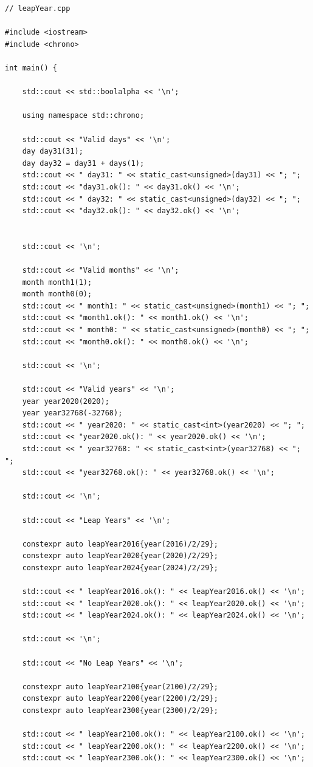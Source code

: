 \begin{lstlisting}[style=styleCXX]
// leapYear.cpp

#include <iostream>
#include <chrono>

int main() {
	
	std::cout << std::boolalpha << '\n';
	
	using namespace std::chrono;
	
	std::cout << "Valid days" << '\n';
	day day31(31);
	day day32 = day31 + days(1);
	std::cout << " day31: " << static_cast<unsigned>(day31) << "; ";
	std::cout << "day31.ok(): " << day31.ok() << '\n';
	std::cout << " day32: " << static_cast<unsigned>(day32) << "; ";
	std::cout << "day32.ok(): " << day32.ok() << '\n';
	
	
	std::cout << '\n';
	
	std::cout << "Valid months" << '\n';
	month month1(1);
	month month0(0);
	std::cout << " month1: " << static_cast<unsigned>(month1) << "; ";
	std::cout << "month1.ok(): " << month1.ok() << '\n';
	std::cout << " month0: " << static_cast<unsigned>(month0) << "; ";
	std::cout << "month0.ok(): " << month0.ok() << '\n';
	
	std::cout << '\n';
	
	std::cout << "Valid years" << '\n';
	year year2020(2020);
	year year32768(-32768);
	std::cout << " year2020: " << static_cast<int>(year2020) << "; ";
	std::cout << "year2020.ok(): " << year2020.ok() << '\n';
	std::cout << " year32768: " << static_cast<int>(year32768) << "; ";
	std::cout << "year32768.ok(): " << year32768.ok() << '\n';
	
	std::cout << '\n';
	
	std::cout << "Leap Years" << '\n';
	
	constexpr auto leapYear2016{year(2016)/2/29};
	constexpr auto leapYear2020{year(2020)/2/29};
	constexpr auto leapYear2024{year(2024)/2/29};
	
	std::cout << " leapYear2016.ok(): " << leapYear2016.ok() << '\n';
	std::cout << " leapYear2020.ok(): " << leapYear2020.ok() << '\n';
	std::cout << " leapYear2024.ok(): " << leapYear2024.ok() << '\n';
	
	std::cout << '\n';
	
	std::cout << "No Leap Years" << '\n';
	
	constexpr auto leapYear2100{year(2100)/2/29};
	constexpr auto leapYear2200{year(2200)/2/29};
	constexpr auto leapYear2300{year(2300)/2/29};
	
	std::cout << " leapYear2100.ok(): " << leapYear2100.ok() << '\n';
	std::cout << " leapYear2200.ok(): " << leapYear2200.ok() << '\n';
	std::cout << " leapYear2300.ok(): " << leapYear2300.ok() << '\n';
	

\end{lstlisting}
